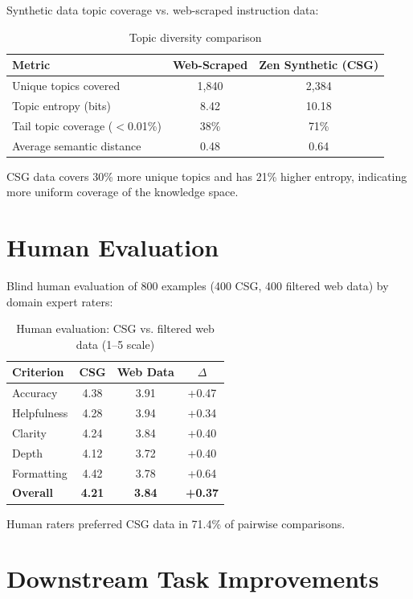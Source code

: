 \documentclass[11pt,a4paper]{article}
\begin{document}
Synthetic data topic coverage vs. web-scraped instruction data:

\begin{table}[H]
\centering
\caption{Topic diversity comparison}
\label{tab:diversity}
\begin{tabular}{lcc}
\toprule
Metric & Web-Scraped & Zen Synthetic (CSG) \\
\midrule
Unique topics covered & 1,840 & 2,384 \\
Topic entropy (bits) & 8.42 & 10.18 \\
Tail topic coverage ($<$0.01\%) & 38\% & 71\% \\
Average semantic distance & 0.48 & 0.64 \\
\bottomrule
\end{tabular}
\end{table}

CSG data covers 30\% more unique topics and has 21\% higher entropy, indicating more uniform coverage of the knowledge space.

\section{Human Evaluation}

Blind human evaluation of 800 examples (400 CSG, 400 filtered web data) by domain expert raters:

\begin{table}[H]
\centering
\caption{Human evaluation: CSG vs. filtered web data (1--5 scale)}
\label{tab:human_eval}
\begin{tabular}{lccc}
\toprule
Criterion & CSG & Web Data & $\Delta$ \\
\midrule
Accuracy & 4.38 & 3.91 & +0.47 \\
Helpfulness & 4.28 & 3.94 & +0.34 \\
Clarity & 4.24 & 3.84 & +0.40 \\
Depth & 4.12 & 3.72 & +0.40 \\
Formatting & 4.42 & 3.78 & +0.64 \\
\midrule
\textbf{Overall} & \textbf{4.21} & \textbf{3.84} & \textbf{+0.37} \\
\bottomrule
\end{tabular}
\end{table}

Human raters preferred CSG data in 71.4\% of pairwise comparisons.

\section{Downstream Task Improvements}
\end{document}
